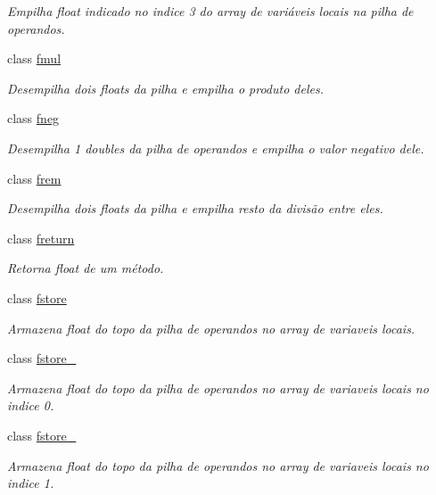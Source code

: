 \begin{DoxyCompactItemize}
\begin{DoxyCompactList}\small\item\em Empilha float indicado no indice 3 do array de variáveis locais na pilha de operandos. \end{DoxyCompactList}\item 
class \hyperlink{class_instruction_impl_1_1fmul}{fmul}
\begin{DoxyCompactList}\small\item\em Desempilha dois floats da pilha e empilha o produto deles. \end{DoxyCompactList}\item 
class \hyperlink{class_instruction_impl_1_1fneg}{fneg}
\begin{DoxyCompactList}\small\item\em Desempilha 1 doubles da pilha de operandos e empilha o valor negativo dele. \end{DoxyCompactList}\item 
class \hyperlink{class_instruction_impl_1_1frem}{frem}
\begin{DoxyCompactList}\small\item\em Desempilha dois floats da pilha e empilha resto da divisão entre eles. \end{DoxyCompactList}\item 
class \hyperlink{class_instruction_impl_1_1freturn}{freturn}
\begin{DoxyCompactList}\small\item\em Retorna float de um método. \end{DoxyCompactList}\item 
class \hyperlink{class_instruction_impl_1_1fstore}{fstore}
\begin{DoxyCompactList}\small\item\em Armazena float do topo da pilha de operandos no array de variaveis locais. \end{DoxyCompactList}\item 
class \hyperlink{class_instruction_impl_1_1fstore__0}{fstore\+\_}
\begin{DoxyCompactList}\small\item\em Armazena float do topo da pilha de operandos no array de variaveis locais no indice 0. \end{DoxyCompactList}\item 
class \hyperlink{class_instruction_impl_1_1fstore__1}{fstore\+\_}
\begin{DoxyCompactList}\small\item\em Armazena float do topo da pilha de operandos no array de variaveis locais no indice 1. \end{DoxyCompactList}\item 

\end{DoxyCompactItemize}
